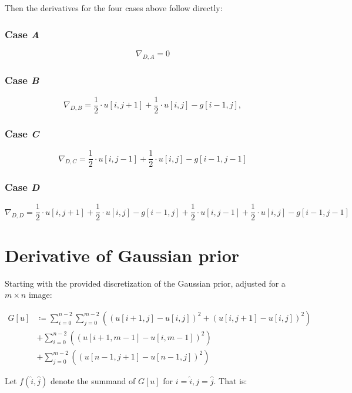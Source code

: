 \documentclass[a4paper]{scrreprt}
\begin{document}
Then the derivatives for the four cases above follow directly:

\subsubsection{Case \emph{A}}

\[
		\nabla_{D, A} = 0
\]

\subsubsection{Case \emph{B}}

\[
		\nabla_{D, B} = 
		\frac{1}{2} \cdot u[i, j + 1] + \frac{1}{2} \cdot u[i, j] - g[i - 1, j],
\]

\subsubsection{Case \emph{C}}

\[
		\nabla_{D, C} = 
		\frac{1}{2} \cdot u[i, j - 1] + \frac{1}{2} \cdot u[i, j] - g[i - 1, j - 1]
\]

\subsubsection{Case \emph{D}}

\[
		\nabla_{D, D} = 
		  \frac{1}{2} \cdot u[i, j + 1] + \frac{1}{2} \cdot u[i, j] - g[i - 1, j] + \frac{1}{2} \cdot u[i, j - 1] + \frac{1}{2} \cdot u[i, j] - g[i - 1, j - 1]
\]

\section{Derivative of Gaussian prior}
\label{sec:derivative_of_gaussian}

Starting with the provided discretization of the Gaussian prior, adjusted for a
$m \times n$ image:

\begin{align*}
		G[u] & \coloneqq \sum_{i=0}^{n-2} \sum_{j=0}^{m-2} \left((u[i + 1, j] - u[i, j])^2 + (u[i,j + 1] - u[i, j])^2\right) \\
			 & + \sum_{i=0}^{n-2} \left((u[i + 1, m - 1] - u[i, m - 1])^2\right) \\
			 & + \sum_{j=0}^{m-2} \left((u[n - 1, j + 1] - u[n - 1, j])^2\right)
\end{align*}

Let $f(\hat{i}, \hat{j})$ denote the summand of $G[u]$ for $i = \hat{i}, j =
\hat{j}$.  That is:
\end{document}
